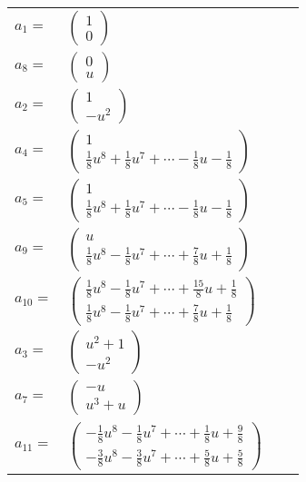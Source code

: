 \documentclass[1p]{elsarticle_modified}
\theoremstyle{definition}
\begin{document}
\begin{tabular}{m{7pt} m{180pt} m{7pt} m{180pt} }
\flushright $a_{1}=$&$\begin{pmatrix}1\\0\end{pmatrix}$ \\
\flushright $a_{8}=$&$\begin{pmatrix}0\\u\end{pmatrix}$ \\
\flushright $a_{2}=$&$\begin{pmatrix}1\\- u^2\end{pmatrix}$ \\
\flushright $a_{4}=$&$\begin{pmatrix}1\\\frac{1}{8} u^8+\frac{1}{8} u^7+\cdots-\frac{1}{8} u-\frac{1}{8}\end{pmatrix}$ \\
\flushright $a_{5}=$&$\begin{pmatrix}1\\\frac{1}{8} u^8+\frac{1}{8} u^7+\cdots-\frac{1}{8} u-\frac{1}{8}\end{pmatrix}$ \\
\flushright $a_{9}=$&$\begin{pmatrix}u\\\frac{1}{8} u^8-\frac{1}{8} u^7+\cdots+\frac{7}{8} u+\frac{1}{8}\end{pmatrix}$ \\
\flushright $a_{10}=$&$\begin{pmatrix}\frac{1}{8} u^8-\frac{1}{8} u^7+\cdots+\frac{15}{8} u+\frac{1}{8}\\\frac{1}{8} u^8-\frac{1}{8} u^7+\cdots+\frac{7}{8} u+\frac{1}{8}\end{pmatrix}$ \\
\flushright $a_{3}=$&$\begin{pmatrix}u^2+1\\- u^2\end{pmatrix}$ \\
\flushright $a_{7}=$&$\begin{pmatrix}- u\\u^3+u\end{pmatrix}$ \\
\flushright $a_{11}=$&$\begin{pmatrix}-\frac{1}{8} u^8-\frac{1}{8} u^7+\cdots+\frac{1}{8} u+\frac{9}{8}\\-\frac{3}{8} u^8-\frac{3}{8} u^7+\cdots+\frac{5}{8} u+\frac{5}{8}\end{pmatrix}$ \\

\end{tabular}
\end{document}
